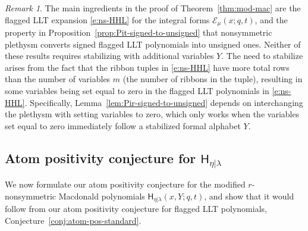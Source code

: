 \documentclass[12pt]{amsart}
\theoremstyle{definition}
\theoremstyle{remark}
\newtheorem{remark}[thm]{Remark}
\newcommand{\Ecal}{{\mathcal E}}
\newcommand{\mE}{\mathsf H}   %
\begin{document}
\begin{remark}\label{rem:why-stabilize}
The main ingredients in the proof of Theorem~\ref{thm:mod-mac} are the
flagged LLT expansion \eqref{e:ns-HHL} for the integral forms $\Ecal
_{\mu }(x;q,t)$, and the property in
Proposition~\ref{prop:Pit-signed-to-unsigned} that nonsymmetric
plethysm converts signed flagged LLT polynomials into unsigned ones.
Neither of these results requires stabilizing with additional
variables $Y$.  The need to stabilize arises from the fact that the
ribbon tuples in \eqref{e:ns-HHL} have more total rows than the number
of variables $m$ (the number of ribbons in the tuple), resulting in
some variables being set equal to zero in the flagged LLT polynomials
in \eqref{e:ns-HHL}.  Specifically,
Lemma~\ref{lem:Pir-signed-to-unsigned} depends on interchanging the
plethysm with setting variables to zero, which only works when the
variables set equal to zero immediately follow a stabilized formal
alphabet $Y$.
\end{remark}




\subsection{Atom positivity conjecture for
\texorpdfstring{$\mE_{\eta|\lambda}$}{H}}
\label{ss:ns-Mac-atom-positivity}

We now formulate our atom positivity
conjecture for the modified $r$-nonsymmetric Macdonald polynomials
$\mE_{\eta|\lambda}(x,Y;q,t)$, and show that it would follow from our
atom positivity conjecture for flagged LLT polynomials,
Conjecture~\ref{conj:atom-pos-standard}.
\end{document}
